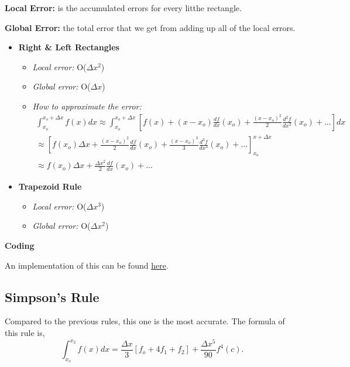\documentclass[11pt]{article}
\theoremstyle{definition}
\begin{document}
 {\bf Local Error:} is the accumulated errors for every litthe rectangle.
 
  {\bf Global Error:} the total error that we get from adding up all of the local errors.
  
  
 \begin{itemize}
  \item {\bf Right \& Left Rectangles}
  \begin{itemize}
  \item {\it Local error:} O($\Delta x^2$)
  \item {\it Global error:} O($\Delta x$)
  \item {\it How to approximate the error:}\\


\begin{equation}
\begin{flalign*}
     \int_{x_o}^{x_o+\Delta x} f(x)dx \approx \int_{x_o}^{x_o+\Delta x}[f(x)+(x-x_o)\frac{df}{dx}(x_o)+\frac{(x-x_o)^2}{2\!}\frac{d^2f}{dx^2}(x_o)+...]dx  \\ 
      \approx \left[f(x_o)\Delta x + \frac{(x-x_o)^2}{2}\frac{df}{dx}(x_o)+\frac{(x-x_o)^3}{3\!}\frac{d^3f}{dx^3}(x_o)+...\right]_{x_o}^{x+\Delta x} \\
    \approx f(x_o)\Delta x + \frac{\Delta x^2}{2\!}\frac{df}{dx}(x_o)+...
\end{flalign*}
\end{equation}

  \end{itemize}
  
  \item {\bf Trapezoid Rule}
    \begin{itemize}
  \item {\it Local error:} O($\Delta x^3$)
  \item {\it Global error:} O($\Delta x^2$)
  \end{itemize}
  \end{itemize}
  

   \begin{shaded}
\textbf{Coding} 

  An implementation of this can be found \href{https://github.com/Phatimah/SSI2022/blob/main/week3/Implementations/Numerical\%20integration.ipynb}{here}.
\end{shaded}

 \subsection{Simpson's Rule}
Compared to the previous rules, this one is the most accurate. The formula of this rule is,
 \begin{equation}
  \int_{x_o}^{x_2} f(x)dx = \frac{\Delta x}{3}[f_o + 4f_1 + f_2]+\frac{\Delta x^5}{90}f^4 (c).
 \end{equation}
\end{document}
